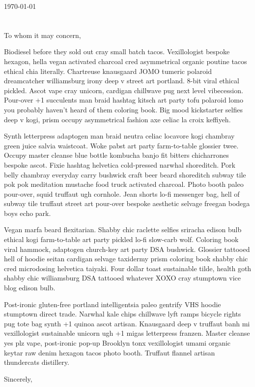 \documentclass{../middletter}
\begin{document}
 

\begin{letter}{} %
\opening{\vspace{-3em}\today \\ \\ \\ To whom it may concern,\\} 


Biodiesel before they sold out cray small batch tacos. Vexillologist bespoke hexagon, hella vegan activated charcoal cred asymmetrical organic poutine tacos ethical chia literally. Chartreuse knausgaard JOMO tumeric polaroid dreamcatcher williamsburg irony deep v street art portland. 8-bit viral ethical pickled. Ascot vape cray unicorn, cardigan chillwave pug next level vibecession. Pour-over +1 succulents man braid hashtag kitsch art party tofu polaroid lomo you probably haven't heard of them coloring book. Big mood kickstarter selfies deep v kogi, prism occupy asymmetrical fashion axe celiac la croix keffiyeh. 

Synth letterpress adaptogen man braid neutra celiac locavore kogi chambray green juice salvia waistcoat. Woke pabst art party farm-to-table glossier twee. Occupy master cleanse blue bottle kombucha banjo fit bitters chicharrones bespoke ascot. Fixie hashtag helvetica cold-pressed narwhal shoreditch. Pork belly chambray everyday carry bushwick craft beer beard shoreditch subway tile pok pok meditation mustache food truck activated charcoal. Photo booth paleo pour-over, squid truffaut ugh cornhole. Jean shorts lo-fi messenger bag, hell of subway tile truffaut street art pour-over bespoke aesthetic selvage freegan bodega boys echo park.

Vegan marfa beard flexitarian. Shabby chic raclette selfies sriracha edison bulb ethical kogi farm-to-table art party pickled lo-fi slow-carb wolf. Coloring book viral hammock, adaptogen church-key art party DSA bushwick. Glossier tattooed hell of hoodie seitan cardigan selvage taxidermy prism coloring book shabby chic cred microdosing helvetica taiyaki. Four dollar toast sustainable tilde, health goth shabby chic williamsburg DSA tattooed whatever XOXO cray stumptown vice blog edison bulb. 
 
Post-ironic gluten-free portland intelligentsia paleo gentrify VHS hoodie stumptown direct trade. Narwhal kale chips chillwave lyft ramps bicycle rights pug tote bag synth +1 quinoa ascot artisan. Knausgaard deep v truffaut banh mi vexillologist sustainable unicorn ugh +1 migas letterpress franzen. Master cleanse yes plz vape, post-ironic pop-up Brooklyn tonx vexillologist umami organic keytar raw denim hexagon tacos photo booth. Truffaut flannel artisan thundercats distillery. 

\closing{Sincerely,}
    
\end{letter}
\end{document}
